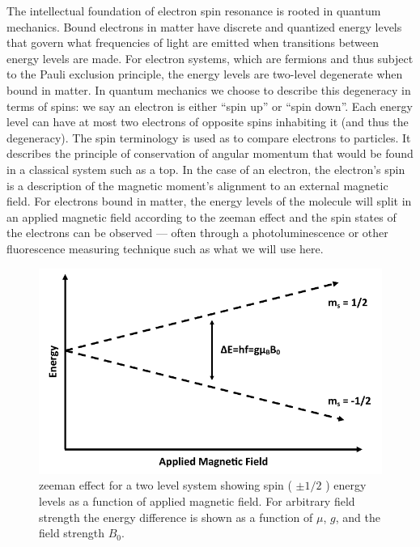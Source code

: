 \documentclass[oneside, noacknowlegments]{BYUPhys}
\begin{document}
The intellectual foundation of electron spin resonance is rooted in quantum mechanics. Bound electrons in matter have discrete and quantized energy levels that govern what frequencies of light are emitted when transitions between energy levels are made. For electron systems, which are fermions and thus subject to the Pauli exclusion principle, the energy levels are two-level degenerate when bound in matter. In quantum mechanics we choose to describe this degeneracy in terms of spins: we say an electron is either ``spin up'' or ``spin down''. Each energy level can have at most two electrons of opposite spins inhabiting it (and thus the degeneracy). The spin terminology is used as to compare electrons to particles. It describes the principle of conservation of angular momentum that would be found in a classical system such as a top. In the case of an electron, the electron's spin is a description of the magnetic moment's alignment to an external magnetic field. For electrons bound in matter, the energy levels of the molecule will split in an applied magnetic field according to the zeeman effect and the spin states of the electrons can be observed --- often through a photoluminescence or other fluorescence measuring technique such as what we will use here.

\begin{figure}[h]
    \centerline{\includegraphics{zeeman_fig}}
    \caption[Zeeman Effect and Resonant Conditions in Matter]{\label{fig:Zeeman}
     zeeman effect for a two level system showing spin ( $\pm 1/2$ ) energy levels as a function of applied magnetic field. For arbitrary field strength the energy difference is shown as a function of $\mu$, $g$, and the field strength $B_0$.}
\end{figure}
\end{document}
